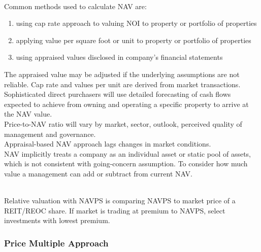 \begin{remark} \\
Common methods used to calculate NAV are:
\begin{enumerate}[label=\roman*.]
\setlength{\itemsep}{0pt}
\item using cap rate approach to valuing NOI to property or portfolio of properties
\item applying value per square foot or unit to property or portfolio of properties
\item using appraised values disclosed in company's financial statements
\end{enumerate}
The appraised value may be adjusted if the underlying assumptions are not reliable. Cap rate and values per unit are derived from market transactions. Sophisticated direct purchasers will use detailed forecasting of cash flows expected to achieve from owning and operating a specific property to arrive at the NAV value.\\
Price-to-NAV ratio will vary by market, sector, outlook, perceived quality of management and governance.\\
Appraisal-based NAV approach lags changes in market conditions.\\
NAV implicitly treats a company as an individual asset or static pool of assets, which is not consistent with going-concern assumption. To consider how much value a management can add or subtract from current NAV.
\end{remark}

\begin{remark} \\
Relative valuation with NAVPS is comparing NAVPS to market price of a REIT/REOC share. If market is trading at premium to NAVPS, select investments with lowest premium.
\end{remark}

\subsubsection{Price Multiple Approach}

